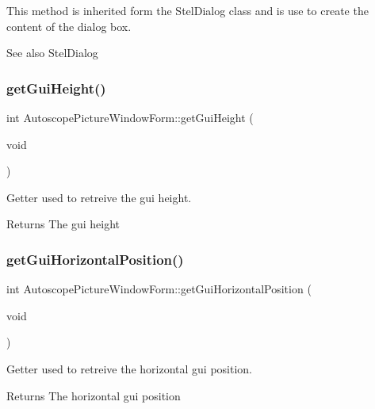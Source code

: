 This method is inherited form the Stel\+Dialog class and is use to create the content of the dialog box. 

\begin{DoxySeeAlso}{See also}
Stel\+Dialog 
\end{DoxySeeAlso}
\mbox{\label{class_autoscope_picture_window_form_ad3fa8efcfcc0631f8b646500fb5cea65}} 
\subsubsection{\texorpdfstring{getGuiHeight()}{getGuiHeight()}}
{\footnotesize\ttfamily int Autoscope\+Picture\+Window\+Form\+::get\+Gui\+Height (\begin{DoxyParamCaption}\item[{void}]{ }\end{DoxyParamCaption})}



Getter used to retreive the gui height. 

\begin{DoxyReturn}{Returns}
The gui height 
\end{DoxyReturn}
\mbox{\label{class_autoscope_picture_window_form_ad9fa74865956b50029f0e2692ab256c8}} 
\subsubsection{\texorpdfstring{getGuiHorizontalPosition()}{getGuiHorizontalPosition()}}
{\footnotesize\ttfamily int Autoscope\+Picture\+Window\+Form\+::get\+Gui\+Horizontal\+Position (\begin{DoxyParamCaption}\item[{void}]{ }\end{DoxyParamCaption})}



Getter used to retreive the horizontal gui position. 

\begin{DoxyReturn}{Returns}
The horizontal gui position 
\end{DoxyReturn}
\mbox{\label{class_autoscope_picture_window_form_ad7eeabfc680448ec5f663f7c68f6e3f4}} 
